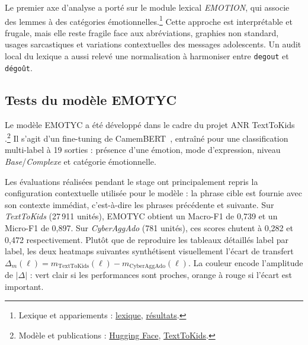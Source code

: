 Le premier axe d'analyse a porté sur le module lexical \textit{EMOTION}, qui associe des lemmes à des catégories émotionnelles.\footnote{Lexique et appariements : \href{https://github.com/GwenTsang/ExpressionEmotionnelle/blob/main/emotions/lexique_emotionnel.tsv}{lexique}, \href{https://github.com/GwenTsang/ExpressionEmotionnelle/tree/main/results/simplesitemo_lexicon_matching}{résultats}.} Cette approche est interprétable et frugale, mais elle reste fragile face aux abréviations, graphies non standard, usages sarcastiques et variations contextuelles des messages adolescents. Un audit local du lexique a aussi relevé une normalisation à harmoniser entre \texttt{degout} et \texttt{dégoût}.

\subsection{Tests du modèle EMOTYC}

Le modèle EMOTYC a été développé dans le cadre du projet ANR TextToKids \citep{etienne2023analyse,etienne2024emotionidentificationfrenchwritten}.\footnote{Modèle et publications : \href{https://huggingface.co/TextToKids/CamemBERT-base-EmoTextToKids}{Hugging Face}, \href{https://texttokids.irisa.fr/publications/}{TextToKids}.} Il s'agit d'un fine-tuning de CamemBERT~\citep{Martin_2020}, entraîné pour une classification multi-label à 19 sorties : présence d'une émotion, mode d'expression, niveau \textit{Base}/\textit{Complexe} et catégorie émotionnelle.

Les évaluations réalisées pendant le stage ont principalement repris la configuration contextuelle utilisée pour le modèle : la phrase cible est fournie avec son contexte immédiat, c'est-à-dire les phrases précédente et suivante. Sur \textit{TextToKids} (27\,911 unités), EMOTYC obtient un Macro-F1 de 0,739 et un Micro-F1 de 0,897. Sur \textit{CyberAggAdo} (781 unités), ces scores chutent à 0,282 et 0,472 respectivement. Plutôt que de reproduire les tableaux détaillés label par label, les deux heatmaps suivantes synthétisent visuellement l'écart de transfert $\Delta_m(\ell) = m_{\text{TextToKids}}(\ell) - m_{\text{CyberAggAdo}}(\ell)$. La couleur encode l'amplitude de $|\Delta|$ : vert clair si les performances sont proches, orange à rouge si l'écart est important.

